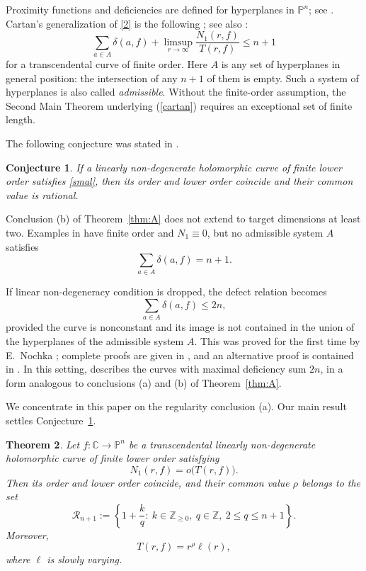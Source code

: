 \documentclass[12pt,letterpaper,reqno]{amsart}
\newtheorem{thm}{Theorem}[section]
\newtheorem{conj}[thm]{Conjecture}
\theoremstyle{definition}
\numberwithin{equation}{section}
\newcommand{\C}{\mathbb C}
\newcommand{\Z}{\mathbb Z}
\newcommand{\PP}{\mathbb P}
\begin{document}
Proximity functions and deficiencies are defined for hyperplanes in
$\PP^{n}$; see \cite{Car33,Ru21}. Cartan's generalization of \eqref{2} is
the following \cite[Theorem~7.1 and Corollary~7.4, pp.~445--446]{GH04};
see also \cite{Car33,Ru21}:
\begin{equation}\label{cartan}
 \sum_{a\in A}\delta(a,f)
 +\limsup_{r\to\infty}\frac{N_1(r,f)}{T(r,f)}\leq n+1
\end{equation}
for a transcendental curve of finite order. 
Here $A$ is any set of
hyperplanes in general position: the intersection of any \(n+1\) of them is
empty. Such a system of hyperplanes is also called \emph{admissible}. 
Without the
finite-order assumption, the Second Main Theorem underlying (\ref{cartan})
requires
an exceptional set of finite length.

The following conjecture was stated in \cite{Ere98}.

\begin{conj}\label{conj:regularity}
If a linearly non-degenerate holomorphic curve of finite lower order
satisfies \eqref{smal}, then its order and lower order coincide and their
common value is rational.
\end{conj}

Conclusion (b) of Theorem~\ref{thm:A} does not extend to
target dimensions at least
two. Examples in \cite{Ere98}
have finite order and $N_1\equiv0$, but no
admissible system $A$ satisfies
\[
 \sum_{a\in A}\delta(a,f)=n+1.
\]

If linear non-degeneracy condition is dropped, the defect relation becomes
\[
 \sum_{a\in A}\delta(a,f)\leq2n,
\]
provided the curve is nonconstant and its image is not contained in the
union of the hyperplanes of the admissible system $A$.
This was proved for the first time by E.~Nochka \cite{Noc83}; complete proofs
are given in
\cite{Voj97,Ru21}, and an alternative proof is contained in \cite{ES92}.
In this setting, \cite{Ere98} describes the curves with maximal
deficiency sum $2n$, in a form analogous to conclusions (a) and (b)
of Theorem~\ref{thm:A}.

We concentrate in this paper on the regularity conclusion (a).
Our main result
settles Conjecture~\ref{conj:regularity}. 

\begin{thm}\label{thm:main}
Let $f:\C\to\PP^{n}$ be a transcendental linearly non-degenerate
holomorphic curve of finite lower order satisfying
\begin{equation}\label{eq:mainhyp}
 N_1(r,f)=o\bigl(T(r,f)\bigr).
\end{equation}
Then its order and lower order coincide, and their common value $\rho$
belongs to the set
\begin{equation}\label{ord}
 \mathcal R_{n+1}:=\left\{1+\frac{k}{q}:\ k\in\Z_{\geq0},\
                           q\in\Z,\ 2\leq q\leq n+1\right\}.
\end{equation}
Moreover,
\begin{equation}\label{reg}
 T(r,f)=r^\rho\ell(r),
\end{equation}
where $\ell$ is slowly varying. 
\end{thm}
\end{document}
